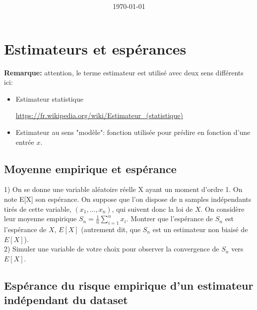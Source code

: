 \documentclass[
10pt, %
a4paper, %
oneside, %
headinclude,footinclude, %
BCOR5mm, %
]{scrartcl}
\title{\normalfont{FTML Exercices 3}\\
}
\author{\spacedlowsmallcaps{}
}
\date{\today}
\begin{document}
\renewcommand{\sectionmark}[1]{\markright{\spacedlowsmallcaps{#1}}}
\lehead{\mbox{\llap{\small\thepage\kern1em\color{halfgray} \vline}\color{halfgray}\hspace{0.5em}\rightmark\hfil}} 
\pagestyle{scrheadings}
\maketitle 
\setcounter{tocdepth}{3} 

\tableofcontents

\section{\large\color{Blue}Estimateurs et espérances}

\textbf{Remarque:} attention, le terme estimateur est utilisé avec deux sens différents ici:
    \begin{itemize}
        \item Estimateur statistique

            \url{https://fr.wikipedia.org/wiki/Estimateur_(statistique)} 
        
        \item Estimateur au sens "modèle": fonction utilisée pour prédire en fonction d'une entrée $x$.
    \end{itemize}

\subsection{Moyenne empirique et espérance}

1) On se donne une variable aléatoire réelle X ayant un moment d’ordre 1. On note E[X] son espérance. On suppose que l’on dispose de n samples indépendants tirés de cette variable, $(x_1,\dots,x_n)$, qui suivent donc la loi de $X$.
On considère leur moyenne empirique $S_n =  \frac{1}{n}\sum_{i=1}^{n} x_i$. Montrer que l’espérance de $S_n$ est l'espérance de $X$, $E[X]$ (autrement dit, que $S_n$ est un estimateur non biaisé de $E[X]$).
\\

2) Simuler une variable de votre choix pour observer la convergence de $S_n$ vers $E[X]$.

\subsection{Espérance du risque empirique d'un estimateur indépendant du dataset}
\end{document}
